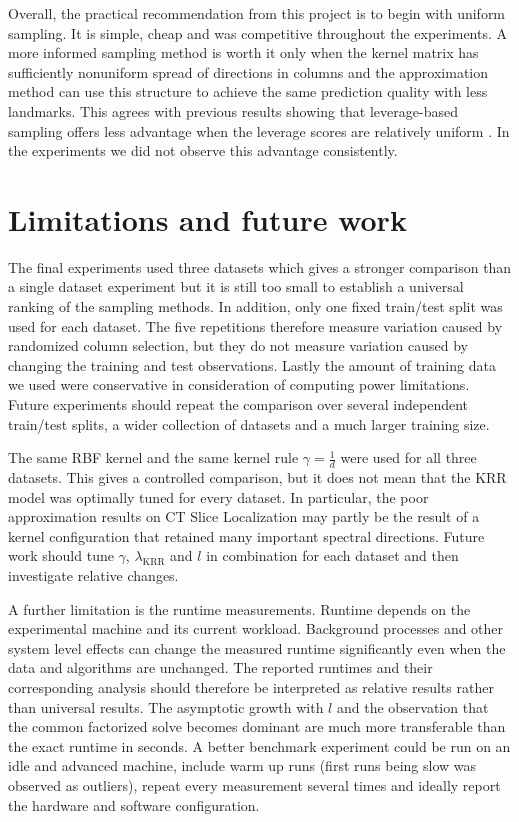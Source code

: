 Overall, the practical recommendation from this project is to begin with uniform sampling. It is simple, cheap and was competitive throughout the experiments. A more informed sampling method is worth it only when the kernel matrix has sufficiently nonuniform spread of directions in columns and the approximation method can use this structure to achieve the same prediction quality with less landmarks. This agrees with previous results showing that leverage-based sampling offers less advantage when the leverage scores are relatively uniform \citep{gittens2016revisiting,musco2017recursive}. In the experiments we did not observe this advantage consistently.

\section{Limitations and future work}

The final experiments used three datasets which gives a stronger comparison than a single dataset experiment but it is still too small to establish a universal ranking of the sampling methods. In addition, only one fixed train/test split was used for each dataset. The five repetitions therefore measure variation caused by randomized column selection, but they do not measure variation caused by changing the training and test observations. Lastly the amount of training data we used were conservative in consideration of computing power limitations. Future experiments should repeat the comparison over several independent train/test splits, a wider collection of datasets and a much larger training size.

The same RBF kernel and the same kernel rule $\gamma=\frac{1}{d}$ were used for all three datasets. This gives a controlled comparison, but it does not mean that the KRR model was optimally tuned for every dataset. In particular, the poor approximation results on CT Slice Localization may partly be the result of a kernel configuration that retained many important spectral directions. Future work should tune $\gamma$, $\lambda_{\mathrm{KRR}}$ and $l$ in combination for each dataset and then investigate relative changes.

A further limitation is the runtime measurements. Runtime depends on the experimental machine and its current workload. Background processes and other system level effects can change the measured runtime significantly even when the data and algorithms are unchanged. The reported runtimes and their corresponding analysis should therefore be interpreted as relative results rather than universal results. The asymptotic growth with $l$ and the observation that the common factorized solve becomes dominant are much more transferable than the exact runtime in seconds. A better benchmark experiment could be run on an idle and advanced machine, include warm up runs (first runs being slow was observed as outliers), repeat every measurement several times and ideally report the hardware and software configuration.

